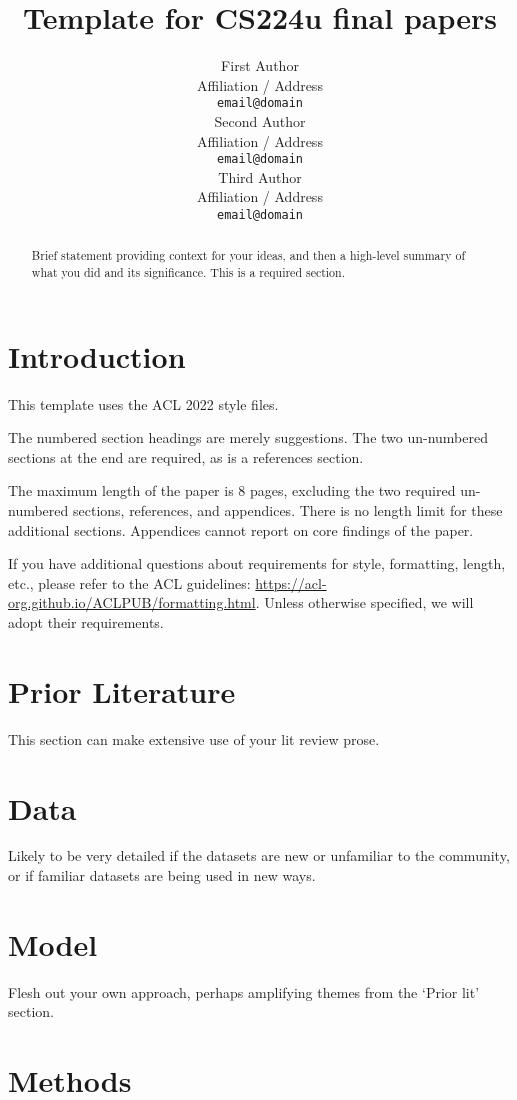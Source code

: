 \documentclass[11pt]{article}
\title{Template for CS224u final papers}
\author{First Author \\
  Affiliation / Address \\
  \texttt{email@domain} \\\And
  Second Author \\
  Affiliation / Address  \\  
  \texttt{email@domain} \\\And
  Third Author \\
  Affiliation / Address \\  
  \texttt{email@domain}
}
\begin{document}
\maketitle
\begin{abstract}
Brief statement providing context for your ideas, and then a high-level summary of what you did and its significance. This is a required section.
\end{abstract}

\section{Introduction}

This template uses the ACL 2022 style files. 

The numbered section headings are merely suggestions. The two un-numbered sections at the end are required, as is a references section. 

The maximum length of the paper is 8 pages, excluding the two required un-numbered sections, references, and appendices. There is no length limit for these additional sections. Appendices cannot report on core findings of the paper.

If you have additional questions about requirements for style, formatting, length, etc., please refer to the ACL guidelines: \url{https://acl-org.github.io/ACLPUB/formatting.html}. Unless otherwise specified, we will adopt their requirements.

\section{Prior Literature}

This section can make extensive use of your lit review prose.

\section{Data}

Likely to be very detailed if the datasets are new or unfamiliar to the community, or if familiar datasets are being used in new ways.

\section{Model}

Flesh out your own approach, perhaps amplifying themes from the `Prior lit' section.

\section{Methods}
\end{document}
